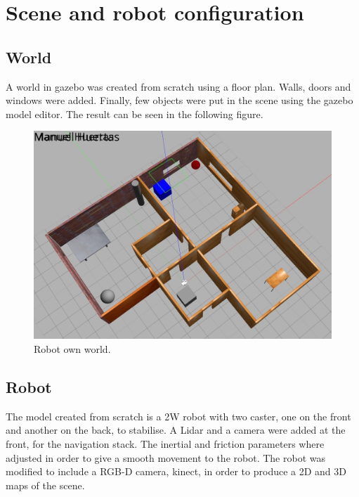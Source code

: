 \documentclass[10pt,journal,compsoc]{IEEEtran}
\begin{document}
\section{Scene and robot configuration}
\subsection{World}
A world in gazebo was created from scratch using a floor plan. Walls, doors and windows were added. Finally, few objects were put in the scene using the gazebo model editor. The result can be seen in the following figure.
\begin{figure}[h]
\centering
\includegraphics[scale=0.15]{robot-own-world}
\caption{Robot own world.}
\label{fig:world}
\end{figure}

\subsection{Robot}
The model created from scratch is a 2W robot with two caster, one on the front and another on the back, to stabilise. A Lidar and a camera were added at the front, for the navigation stack. The inertial and friction parameters where adjusted in order to give a smooth movement to the robot. The robot was modified to include a RGB-D camera, kinect, in order to produce a 2D and 3D maps of the scene.
\end{document}
